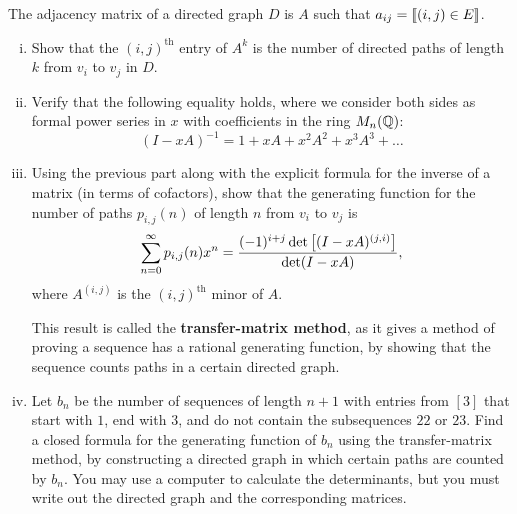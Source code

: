 \documentclass[12pt]{memoir}
\begin{document}
\begin{Ej}[Exercise 4]
    The adjacency matrix of a directed graph $D$ is $A$ such that $a_{ij}=\llbracket(i,j)\in E\rrbracket$.
    \begin{enumerate}[i)]
        \itemsep=-0.4em 
        \item Show that the $(i,j)^{\text{th}}$ entry of $A^k$ is the number of directed paths of length $k$ from $v_i$ to $v_j$ in $D$.
        \item Verify that the following equality holds, where we consider both sides as formal power series in $x$ with coefficients in the ring $M_n(\mathbb{Q})$: 
        $$(I-xA)^{-1}=1+xA+x^2A^2+x^3A^3+\dots$$
        \item Using the previous part along with the explicit formula for the inverse of a matrix (in terms of cofactors), show that the generating function for the number of paths $p_{i,j}(n)$ of length $n$ from $v_i$ to $v_j$ is 
        $$\sum_{n=0}^\infty p_{i,j}(n)x^n=\frac{(-1)^{i+j}\det\left\lbrack(I-xA)^{(j,i)}\right\rbrack}{\det(I-xA)},$$
        where $A^{(i,j)}$ is the $(i,j)^{\text{th}}$ minor of $A$.\par
        This result is called the \textbf{transfer-matrix method}, as it gives a method of proving a sequence has a rational generating function, by showing that the sequence counts paths in a certain directed graph.
        \item Let $b_n$ be the number of sequences of length $n + 1$ with entries from $[3]$ that
        start with $1$, end with $3$, and do not contain the subsequences $22$ or $23$. Find a closed formula for
        the generating function of $b_n$ using the transfer-matrix method, by constructing a directed graph
        in which certain paths are counted by $b_n$. You may use a computer to calculate the determinants,
        but you must write out the directed graph and the corresponding matrices.
    \end{enumerate}
\end{Ej}
\end{document}

